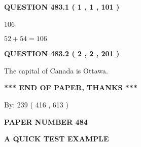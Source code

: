 \documentclass[12pt]{article}
\begin{document}
{\textbf{\Large{QUESTION
483.1 
 ( 1 , 1 , 101 )
}}}
  
  
 
 
\noindent{}

106
 
 
 
 
\noindent{}

$ %
52 +  %
54=   %
106$
 
 
  
\vspace{0.2in}
  
{\textbf{\Large{QUESTION
483.2 
 ( 2 , 2 , 201 )
}}}
  
  
 
 
\noindent{}
 
 
The capital of Canada is Ottawa.
 
 
 
 
   
   
 \vspace{0.2in}
 
   
   
   
   
\vspace{1.0in} 
{\textbf{\large{ *** END OF PAPER, THANKS *** }}} 
   
   
\hspace{1.0in} By: 
 239 ( 416 ,  613 )
   
   
   
   
\newpage 
\setcounter{page}{ 
   484001 } 
   
   
   
   
 {\textbf{ \Large{ PAPER NUMBER  484  }}}
   
   
\vspace{0.2in}
   
   
   
   
   
   
 \vspace{0.2in}
{\LARGE {\textbf{ A QUICK TEST EXAMPLE}}}
   
   
   
\vspace{0.2in}
   
\end{document}
